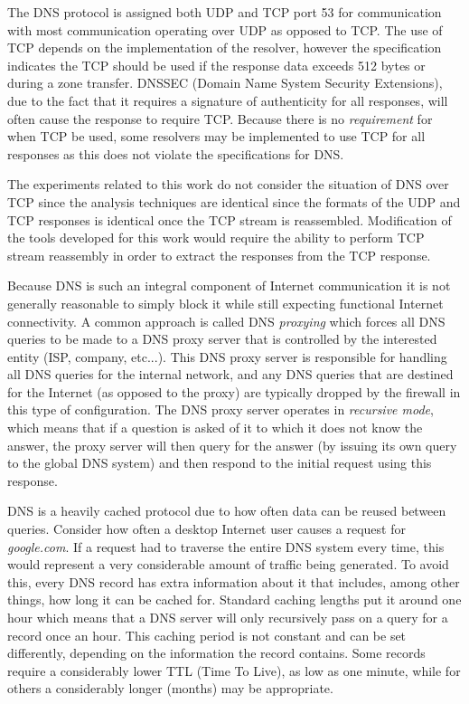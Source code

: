 \documentclass[12pt]{article}
\theoremstyle{remark}
\theoremstyle{definition}
\theoremstyle{definition}
\theoremstyle{definition}
\begin{document}
The DNS protocol is assigned both UDP and TCP port 53 for
communication with most communication operating over UDP as opposed to TCP. The
use of TCP depends on the implementation of the resolver, however the
specification indicates the TCP should be used if the response data exceeds 512
bytes or during a zone transfer\cite{rfc1035}. DNSSEC (Domain Name System
Security Extensions), due to the fact that it requires a signature of
authenticity for all responses, will often cause the response to
require TCP\cite{rfc4034}. 
Because there is no \emph{requirement} for when
TCP be used, some resolvers may be implemented to use TCP for all responses as
this does not violate the specifications for DNS.

The experiments related to this work do not consider the situation of DNS over
TCP since the analysis techniques are identical since the formats of the UDP
and TCP responses is identical once the TCP stream is reassembled. Modification
of the tools developed for this work would require the ability to perform TCP
stream reassembly in order to extract the responses from the TCP response.

Because DNS is such an integral component of Internet communication it is not
generally reasonable to simply block it while still expecting functional Internet
connectivity. A common approach is called DNS \emph{proxying} which
forces all DNS queries to be made to a DNS proxy server that is controlled by
the interested entity (ISP, company, etc...). This DNS proxy server is
responsible for handling all DNS queries for the internal network, and any DNS
queries that are destined for the Internet (as opposed to the proxy) are
typically dropped by the
firewall in this type of configuration. The DNS proxy server operates in
\emph{recursive mode}, which means that if a question is asked of it to which
it does not know the answer, the proxy server will then query for the answer (by 
issuing its own query to the global DNS system) and then respond to the initial
request using this response.

DNS is a heavily cached protocol due to how often data can be reused between
queries. Consider how often a desktop Internet user causes a request for
\emph{google.com}. If a request had to traverse the entire DNS system every
time, this would represent a very considerable amount of traffic being
generated. To avoid this, every DNS record has extra information about it that
includes, among other things, how long it can be cached for. Standard
caching lengths put it around one hour which means that a DNS server will only
recursively pass on a query for a record once an hour. This caching period is
not constant and can be set differently, depending on the information the
record contains. Some records require a considerably lower TTL (Time To Live),
as low as one minute, while for others a considerably longer (months) may be
appropriate.
\end{document}
